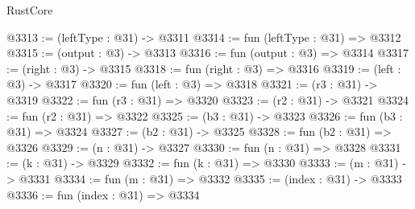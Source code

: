 \begin{lexlean}{RustCore}
\begin{coremodule}
@3313 := (leftType : @31) -> @3311
@3314 := fun (leftType : @31) => @3312
@3315 := (output : @3) -> @3313
@3316 := fun (output : @3) => @3314
@3317 := (right : @3) -> @3315
@3318 := fun (right : @3) => @3316
@3319 := (left : @3) -> @3317
@3320 := fun (left : @3) => @3318
@3321 := (r3 : @31) -> @3319
@3322 := fun (r3 : @31) => @3320
@3323 := (r2 : @31) -> @3321
@3324 := fun (r2 : @31) => @3322
@3325 := (b3 : @31) -> @3323
@3326 := fun (b3 : @31) => @3324
@3327 := (b2 : @31) -> @3325
@3328 := fun (b2 : @31) => @3326
@3329 := (n : @31) -> @3327
@3330 := fun (n : @31) => @3328
@3331 := (k : @31) -> @3329
@3332 := fun (k : @31) => @3330
@3333 := (m : @31) -> @3331
@3334 := fun (m : @31) => @3332
@3335 := (index : @31) -> @3333
@3336 := fun (index : @31) => @3334
\end{coremodule}
\end{lexlean}
